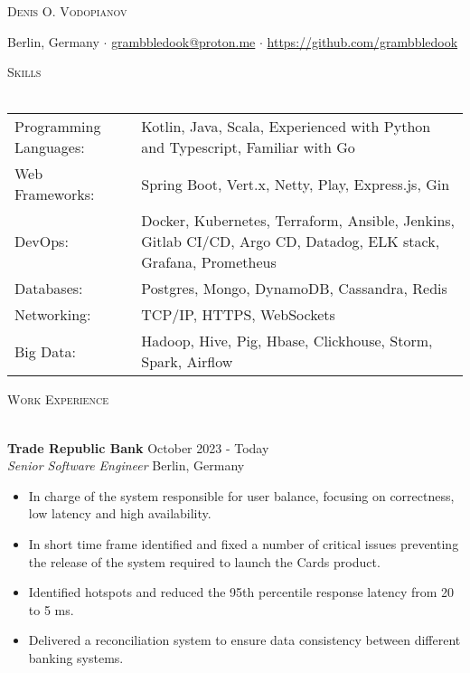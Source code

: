 \documentclass[a4paper]{article}
\makeatletter
\newcommand{\lineunder} {
    \vspace*{-8pt} \\
    \hspace*{-18pt} \hrulefill \\
}
\newcommand{\header} [1] {
        {\hspace*{-18pt}\vspace*{6pt} \textsc{#1}}
    \vspace*{-6pt} \lineunder
}
\newcommand{\employer} [4] {
    \textbf{#1} \hfill {#3} \\
    \textit{#2} \hfill {#4} \\
    \vspace{0mm}
}
\def\email{grambbledook@proton.me}
\def\phone{555-55-55}
\makeatother
\begin{document}
    \vspace*{-40pt}


    \vspace*{-10pt}
    \begin{center}
        \Huge \scshape {Denis O. Vodopianov} \\ \vspace{1mm}
    \end{center}

    \begin{center}
        Berlin, Germany $\cdot$
        \href{mailto:\email}{\email} $\cdot$
        \url{https://github.com/grambbledook}\\
    \end{center}

    \header{Skills}
    \begin{tabular}{V{5cm} @{\hskip 0.6cm} V{16cm}}
        Programming Languages: & Kotlin, Java,  Scala, Experienced with Python and Typescript, Familiar with Go                                 \\
        Web Frameworks:        & Spring Boot, Vert.x, Netty, Play, Express.js, Gin                                                            \\
        DevOps:                & Docker, Kubernetes, Terraform, Ansible, Jenkins, Gitlab CI/CD, Argo CD, Datadog, ELK stack, Grafana, Prometheus \\
        Databases:             & Postgres, Mongo, DynamoDB, Cassandra, Redis                                                                         \\
        Networking:            & TCP/IP, HTTPS, WebSockets                                                                                    \\
        Big Data:              & Hadoop, Hive, Pig, Hbase, Clickhouse, Storm, Spark, Airflow                                                  \\
    \end{tabular}
    \vspace{2mm}


    \header{Work Experience}
    \vspace{1mm}

    \employer{Trade Republic Bank}{Senior Software Engineer}{October 2023 - Today}{Berlin, Germany}
    \begin{itemize}[itemsep=-1mm]
        \item In charge of the system responsible for user balance, focusing on correctness, low latency and high availability.
        \item In short time frame identified and fixed a number of critical issues preventing the release of the system required to launch the Cards product.
        \item Identified hotspots and reduced the 95th percentile response latency from 20 to 5 ms.
        \item Delivered a reconciliation system to ensure data consistency between different banking systems.
    \end{itemize}
\end{document}
